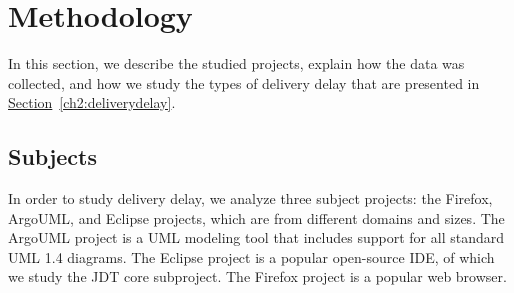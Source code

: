 \section{Methodology} \label{ch4:caseStudy} In this section, we describe the
studied projects, explain how the data was collected, and how we study the types
of delivery delay that are presented in
\hyperref[ch2:deliverydelay]{Section}~\ref{ch2:deliverydelay}.

\subsection{Subjects} \label{ch4:sec:subjects}

In order to study delivery delay, we analyze three subject projects: the
Firefox, ArgoUML, and Eclipse projects, which are from different domains and
sizes. The ArgoUML project is a UML modeling tool that includes support for all
standard UML 1.4 diagrams. The
Eclipse project is a popular open-source IDE, of which we study the JDT core
subproject. The Firefox project is a
popular web browser.


